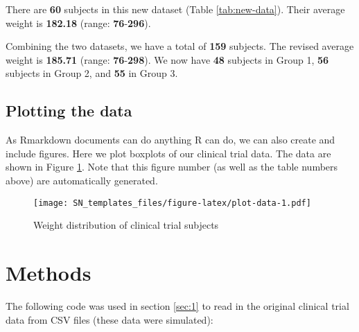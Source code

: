 \documentclass[smallextended]{svjour3}       %
\begin{document}
There are \textbf{60} subjects in this new dataset (Table \ref{tab:new-data}). Their average weight is \textbf{182.18} (range: \textbf{76}-\textbf{296}).

Combining the two datasets, we have a total of \textbf{159} subjects. The revised average weight is \textbf{185.71} (range: \textbf{76}-\textbf{298}). We now have \textbf{48} subjects in Group 1, \textbf{56} subjects in Group 2, and \textbf{55} in Group 3.

\hypertarget{sec:2}{%
\subsection{Plotting the data}\label{sec:2}}

As Rmarkdown documents can do anything R can do, we can also create and include figures. Here we plot boxplots of our clinical trial data. The data are shown in Figure \ref{fig:plot-data}. Note that this figure number (as well as the table numbers above) are automatically generated.

\begin{figure}
\centering
\texttt{[image: SN\_templates\_files/figure-latex/plot-data-1.pdf]}
\caption{\label{fig:plot-data}Weight distribution of clinical trial subjects}
\end{figure}

\hypertarget{methods}{%
\section{Methods}\label{methods}}

The following code was used in section \ref{sec:1} to read in the original clinical trial data from CSV files (these data were simulated):
\end{document}
